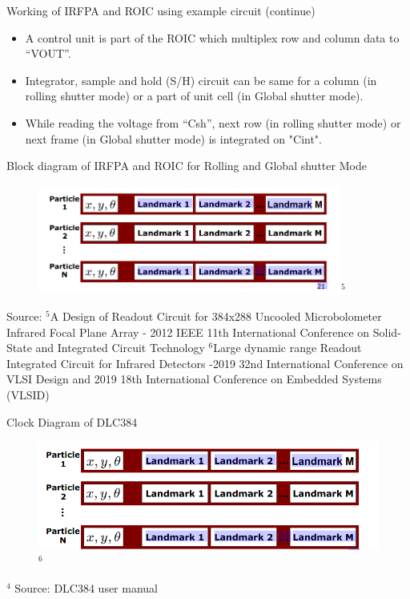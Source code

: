 \documentclass{beamer}
\begin{document}
\begin{frame}{Working of IRFPA and ROIC using example circuit (continue)}
    \begin{itemize}
        \item A control unit is part of the ROIC which multiplex row and column data to “VOUT”.
        \item Integrator, sample and hold (S/H) circuit can be same for a column (in rolling shutter mode)  or a part of unit cell (in Global shutter mode).
        \item While reading the voltage from “Csh”, next row (in rolling shutter mode)  or next frame (in Global shutter mode) is integrated on "Cint".
    \end{itemize}
\end{frame}


\begin{frame}{Block diagram of IRFPA and ROIC for Rolling and Global shutter Mode }
   \begin{figure}
        \centering
        \includegraphics[width= 100mm]{RBPF_SLAM.png}$^{5}$
    \end{figure}
    \vfill
    \tiny Source:
    \newline \tiny{$^{5}$}A Design of Readout Circuit for 384x288 Uncooled Microbolometer Infrared Focal Plane Array - 2012 IEEE 11th International Conference on Solid-State and Integrated Circuit Technology
    \newline \tiny{$^{6}$}Large dynamic range Readout Integrated Circuit for Infrared Detectors -2019 32nd International Conference on VLSI Design and 2019 18th International Conference on Embedded Systems (VLSID)
\end{frame}


\begin{frame}{Clock Diagram of DLC384}
    \begin{figure}
        \centering
        \includegraphics[width=\textwidth]{RBPF_particles.png}$^{6}$
    \end{figure}
    \vfill
    \tiny{$^{4}$} Source: DLC384 user manual
\end{frame}
\end{document}
